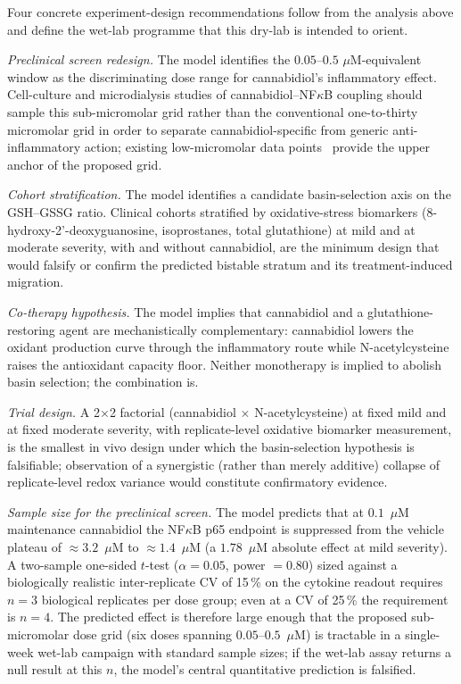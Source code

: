 \documentclass[10pt,letterpaper]{article}
\begin{document}
Four concrete experiment-design recommendations follow from the analysis above and define the wet-lab programme that this dry-lab is intended to orient.

\textit{Preclinical screen redesign.} The model identifies the $0.05$--$0.5$ $\mu$M-equivalent window as the discriminating dose range for cannabidiol's inflammatory effect. Cell-culture and microdialysis studies of cannabidiol--NF$\kappa$B coupling should sample this sub-micromolar grid rather than the conventional one-to-thirty micromolar grid in order to separate cannabidiol-specific from generic anti-inflammatory action; existing low-micromolar data points~\cite{kozela2010,juknat2013} provide the upper anchor of the proposed grid.

\textit{Cohort stratification.} The model identifies a candidate basin-selection axis on the GSH--GSSG ratio. Clinical cohorts stratified by oxidative-stress biomarkers (8-hydroxy-2'-deoxyguanosine, isoprostanes, total glutathione) at mild and at moderate severity, with and without cannabidiol, are the minimum design that would falsify or confirm the predicted bistable stratum and its treatment-induced migration.

\textit{Co-therapy hypothesis.} The model implies that cannabidiol and a glutathione-restoring agent are mechanistically complementary: cannabidiol lowers the oxidant production curve through the inflammatory route while N-acetylcysteine raises the antioxidant capacity floor. Neither monotherapy is implied to abolish basin selection; the combination is.

\textit{Trial design.} A 2$\times$2 factorial (cannabidiol $\times$ N-acetylcysteine) at fixed mild and at fixed moderate severity, with replicate-level oxidative biomarker measurement, is the smallest in vivo design under which the basin-selection hypothesis is falsifiable; observation of a synergistic (rather than merely additive) collapse of replicate-level redox variance would constitute confirmatory evidence.

\textit{Sample size for the preclinical screen.} The model predicts that at $0.1$~$\mu$M maintenance cannabidiol the NF$\kappa$B p65 endpoint is suppressed from the vehicle plateau of $\approx 3.2$~$\mu$M to $\approx 1.4$~$\mu$M (a $1.78$~$\mu$M absolute effect at mild severity). A two-sample one-sided $t$-test ($\alpha = 0.05$, power $= 0.80$) sized against a biologically realistic inter-replicate CV of 15\,\% on the cytokine readout requires $n = 3$ biological replicates per dose group; even at a CV of 25\,\% the requirement is $n = 4$. The predicted effect is therefore large enough that the proposed sub-micromolar dose grid (six doses spanning $0.05$--$0.5$~$\mu$M) is tractable in a single-week wet-lab campaign with standard sample sizes; if the wet-lab assay returns a null result at this $n$, the model's central quantitative prediction is falsified.
\end{document}
